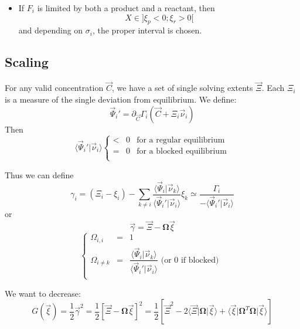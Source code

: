 \documentclass[aps,12pt]{revtex4}
\begin{document}
\begin{itemize}
\begin{itemize}
	\item If $F_i$ is limited by both a product and a reactant, then $$X\in\rbrack \xi_p < 0 ; \xi_r > 0 \lbrack$$
	and depending on $\sigma_i$, the proper interval is chosen.
	\end{itemize}
	
\end{itemize}

\subsection{Scaling}

For any valid concentration $\vec{C}$, we have a set of single solving extents $\vec{\Xi}$.
Each $\Xi_i$ is a measure of the single deviation from equilibrium.
We define:
\begin{equation}
	\vec{\Psi}_i' = \partial_{\vec{C}}\Gamma_i(\vec{C} + \Xi_i \vec{\nu}_i)
\end{equation}
Then
\begin{equation}
	\langle \vec{\Psi}_i'\vert \vec{\nu}_i \rangle 
	\left\lbrace
	\begin{array}{rcl}
	 < & 0 & \text{for a regular equilibrium} \\
	 = & 0 & \text{for a blocked equilibrium} \\
	\end{array}
	\right.
\end{equation}

Thus we can define 
\begin{equation}
	\gamma_i = \left(\Xi_i - \xi_i\right) - \sum_{k\not=i} \dfrac{\langle \vec{\Psi}_i\vert \vec{\nu}_k\rangle}{\langle \vec{\Psi}_i'\vert \vec{\nu}_i \rangle} \xi_k
	\simeq \dfrac{\Gamma_i}{-\langle \vec{\Psi}_i'\vert \vec{\nu}_i \rangle} 
\end{equation}
or
\begin{equation}
	\vec{\gamma} = \vec{\Xi} - \bm{\Omega} \vec{\xi}
\end{equation}
\begin{equation}
\left\lbrace
\begin{array}{rcl}
	\Omega_{i,i} & = &1\\
	\Omega_{i\not=k} & = & \dfrac{\langle \vec{\Psi}_i\vert \vec{\nu}_k\rangle}{\langle \vec{\Psi}_i'\vert \vec{\nu}_i \rangle} \text{ (or 0 if blocked) }\\
\end{array}
\right.
\end{equation}
 
We want to decrease:
\begin{equation}
	G(\vec{\xi}) = \dfrac{1}{2}\vec{\gamma}^2 = \dfrac{1}{2} \left[ \vec{\Xi} - \bm{\Omega} \vec{\xi} \right]^2
	= \dfrac{1}{2}
	\left[
	\vec{\Xi}^2
    - 2 \langle\vec{\Xi}\vert\bm{\Omega}\vert\vec{\xi}\rangle  
	+ \langle\vec{\xi}\vert\bm{\Omega}^T\bm{\Omega}\vert \vec{\xi}\rangle
	 \right]
\end{equation}
\end{document}

